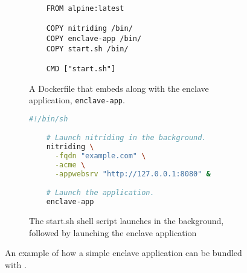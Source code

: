 \begin{figure}[t]
  \begin{subfigure}[b]{\linewidth}
    \centering
    \begin{lstlisting}
    FROM alpine:latest

    COPY nitriding /bin/
    COPY enclave-app /bin/
    COPY start.sh /bin/

    CMD ["start.sh"]
    \end{lstlisting}
    \caption{A Dockerfile that embeds \tool{} along with the enclave
      application, \texttt{enclave-app}.}
    \label{fig:dockerfile}
  \end{subfigure}

  \begin{subfigure}[b]{\linewidth}
    \centering
    \begin{lstlisting}[language=bash]
    #!/bin/sh

    # Launch nitriding in the background.
    nitriding \
      -fqdn "example.com" \
      -acme \
      -appwebsrv "http://127.0.0.1:8080" &

    # Launch the application.
    enclave-app
    \end{lstlisting}
    \caption{The start.sh shell script launches \tool{} in the background,
    followed by launching the enclave application}
    \label{fig:start}
  \end{subfigure}

  \caption{An example of how a simple enclave application can be bundled with
  \tool.}
  \label{fig:example}
\end{figure}
